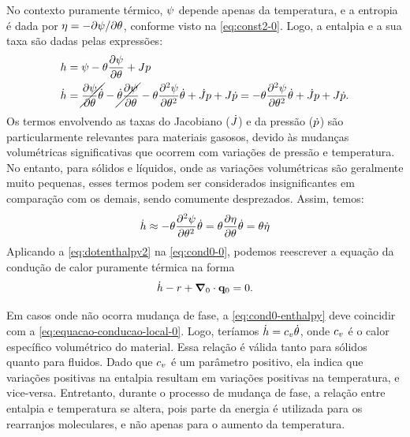 \documentclass[Tese.tex]{subfiles}
\begin{document}
No contexto puramente térmico, $\psi$ depende apenas da temperatura, e a entropia é dada por $\eta = -\partial\psi/\partial\theta$, conforme visto na \cref{eq:const2-0}. Logo, a entalpia e a sua taxa são dadas pelas expressões:
\begin{align}
&h = \psi - \theta\dfrac{\partial\psi}{\partial\theta} + Jp \\
&\dot{h} = \cancel{\dfrac{\partial\psi}{\partial\theta}\dot{\theta}} - \cancel{\dot{\theta}\dfrac{\partial\psi}{\partial\theta}} - \theta\dfrac{\partial^2\psi}{\partial\theta^2}\dot{\theta} + \dot{J}p + J\dot{p} = - \theta\dfrac{\partial^2\psi}{\partial\theta^2}\dot{\theta} + \dot{J}p + J\dot{p}. \label{eq:dotenthalpy}
\end{align}
Os termos envolvendo as taxas do Jacobiano ($\dot{J}$) e da pressão ($\dot{p}$) são particularmente relevantes para materiais gasosos, devido às mudanças volumétricas significativas que ocorrem com variações de pressão e temperatura. No entanto, para sólidos e líquidos, onde as variações volumétricas são geralmente muito pequenas, esses termos podem ser considerados insignificantes em comparação com os demais, sendo comumente desprezados. Assim, temos:
\begin{equation}\label{eq:dotenthalpy2}
\dot{h} \approx - \theta\dfrac{\partial^2\psi}{\partial\theta^2}\dot{\theta} = \theta\dfrac{\partial\eta}{\partial\theta}\dot{\theta} = \theta\dot{\eta}
\end{equation}
Aplicando a \cref{eq:dotenthalpy2} na \cref{eq:cond0-0}, podemos reescrever a equação da condução de calor puramente térmica na forma
\begin{equation}\label{eq:cond0-enthalpy}
\dot{h} - r + \boldsymbol{\nabla}_0\cdot\mathbf{q}_0 = 0.
\end{equation}

Em casos onde não ocorra mudança de fase, a \cref{eq:cond0-enthalpy} deve coincidir com a \cref{eq:equacao-conducao-local-0}. Logo, teríamos $\dot{h} = c_v\dot{\theta}$, onde $c_v$ é o calor específico volumétrico do material. Essa relação é válida tanto para sólidos quanto para fluidos. Dado que $c_v$ é um parâmetro positivo, ela indica que variações positivas na entalpia resultam em variações positivas na temperatura, e vice-versa. Entretanto, durante o processo de mudança de fase, a relação entre entalpia e temperatura se altera, pois parte da energia é utilizada para os rearranjos moleculares, e não apenas para o aumento da temperatura.
\end{document}
